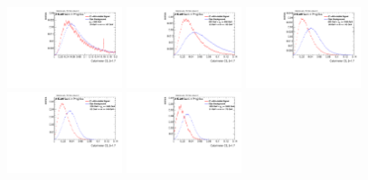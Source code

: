 \begin{figure}[H]
\includegraphics[width=0.3\textwidth]{sascha_input/Appendix/Distributions/higgs/distributions/beta17/h_recoJet_C2_17_bin1.pdf} \hspace{1mm}
\includegraphics[width=0.3\textwidth]{sascha_input/Appendix/Distributions/higgs/distributions/beta17/h_recoJet_C2_17_bin2.pdf} \hspace{4mm}
\includegraphics[width=0.3\textwidth]{sascha_input/Appendix/Distributions/higgs/distributions/beta17/h_recoJet_C2_17_bin3.pdf} 
\bigskip
\includegraphics[width=0.3\textwidth]{sascha_input/Appendix/Distributions/higgs/distributions/beta17/h_recoJet_C2_17_bin4.pdf} \hspace{4mm}
\includegraphics[width=0.3\textwidth]{sascha_input/Appendix/Distributions/higgs/distributions/beta17/h_recoJet_C2_17_bin5.pdf} 


\end{figure}
